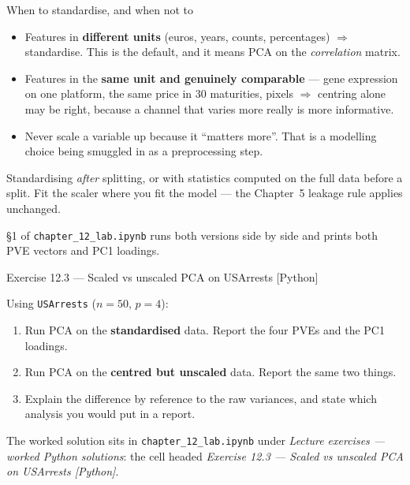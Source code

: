 \documentclass[aspectratio=169,11pt]{beamer}
\begin{document}
\begin{frame}{When to standardise, and when not to}
  \footnotesize
  \begin{readme}
    \begin{itemize}
      \item Features in \textbf{different units} (euros, years, counts, percentages)
            $\Rightarrow$ standardise. This is the default, and it means PCA on the
            \emph{correlation} matrix.
      \item Features in the \textbf{same unit and genuinely comparable} --- gene
            expression on one platform, the same price in $30$ maturities, pixels
            $\Rightarrow$ centring alone may be right, because a channel that varies more
            really is more informative.
      \item Never scale a variable up because it ``matters more''. That is a modelling
            choice being smuggled in as a preprocessing step.
    \end{itemize}
  \end{readme}
  \begin{mistake}
    Standardising \emph{after} splitting, or with statistics computed on the full data
    before a split. Fit the scaler where you fit the model --- the Chapter~5 leakage rule
    applies unchanged.
  \end{mistake}
  \begin{labnote}
    \S1 of \texttt{chapter\_12\_lab.ipynb} runs both versions side by side and prints both PVE
    vectors and PC1 loadings.
  \end{labnote}
\end{frame}

\begin{frame}{Exercise 12.3 --- Scaled vs unscaled PCA on USArrests [Python]}
\begin{exercise}
  Using \texttt{USArrests} ($n=50$, $p=4$):
  \begin{enumerate}
    \item Run PCA on the \textbf{standardised} data. Report the four PVEs and the PC1
          loadings.
    \item Run PCA on the \textbf{centred but unscaled} data. Report the same two things.
    \item Explain the difference by reference to the raw variances, and state which
          analysis you would put in a report.
  \end{enumerate}
\end{exercise}
\begin{labnote}
  The worked solution sits in \texttt{chapter\_12\_lab.ipynb} under
  \emph{Lecture exercises --- worked Python solutions}: the cell headed
  \emph{Exercise 12.3 --- Scaled vs unscaled PCA on USArrests [Python]}.
\end{labnote}
\end{frame}
\end{document}
